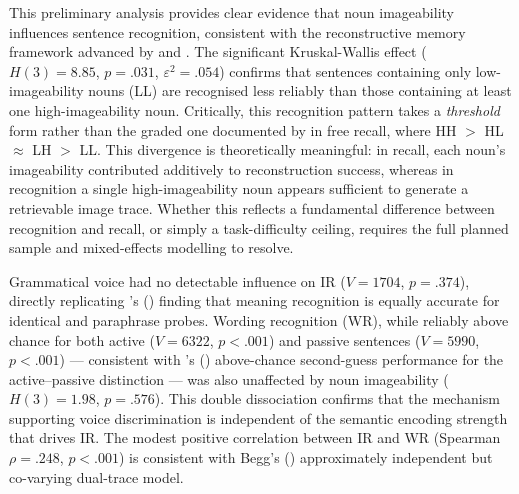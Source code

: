 \documentclass[12pt, a4paper]{article}
\begin{document}
This preliminary analysis provides clear evidence that noun imageability
influences sentence recognition, consistent with the reconstructive memory
framework advanced by \citet{james1973} and \citet{begg1971}. The significant
Kruskal-Wallis effect ($H(3) = 8.85$, $p = .031$, $\varepsilon^2 = .054$)
confirms that sentences containing only low-imageability nouns (LL) are
recognised less reliably than those containing at least one high-imageability
noun. Critically, this recognition pattern takes a \textit{threshold} form
rather than the graded one documented by \citet{james1973} in free recall,
where HH $>$ HL $\approx$ LH $>$ LL. This divergence is theoretically
meaningful: in recall, each noun's imageability contributed additively to
reconstruction success, whereas in recognition a single high-imageability
noun appears sufficient to generate a retrievable image trace. Whether this
reflects a fundamental difference between recognition and recall, or simply
a task-difficulty ceiling, requires the full planned sample and mixed-effects
modelling to resolve.

Grammatical voice had no detectable influence on IR ($V = 1704$, $p = .374$),
directly replicating \citeauthor{begg1971}'s (\citeyear{begg1971}) finding
that meaning recognition is equally accurate for identical and paraphrase probes.
Wording recognition (WR), while reliably above chance for both active
($V = 6322$, $p < .001$) and passive sentences ($V = 5990$, $p < .001$) —
consistent with \citeauthor{bregman1968}'s (\citeyear{bregman1968}) above-chance
second-guess performance for the active--passive distinction — was also unaffected
by noun imageability ($H(3) = 1.98$, $p = .576$). This double dissociation
confirms that the mechanism supporting voice discrimination is independent of
the semantic encoding strength that drives IR. The modest positive correlation
between IR and WR (Spearman $\rho = .248$, $p < .001$) is consistent with
Begg's (\citeyear{begg1971}) approximately independent but co-varying
dual-trace model.
\end{document}
